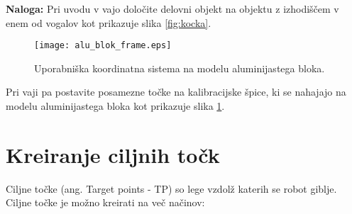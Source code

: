 \vspace{1cm}

\noindent \textbf{Naloga:} Pri uvodu v vajo določite delovni objekt na objektu z izhodiščem v enem od vogalov kot prikazuje slika \ref{fig:kocka}.

\begin{figure}[h]
\centering\label{fig:kalibSpice}
\texttt{[image: alu\_blok\_frame.eps]}
  \caption{Uporabniška koordinatna sistema na modelu aluminijastega bloka.}
\end{figure}

Pri vaji pa postavite posamezne točke na kalibracijske špice, ki se nahajajo na modelu aluminijastega bloka kot prikazuje slika \ref{fig:kalibSpice}.


\section{Kreiranje ciljnih točk}

Ciljne točke (ang. Target points - TP) so lege vzdolž katerih se robot
giblje. Ciljne točke je možno kreirati na več načinov:

